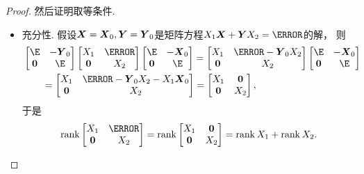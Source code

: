 \begin{example}
\begin{proof}
然后证明取等条件.
\begin{itemize}
	\item 充分性.
	假设\(\boldsymbol{X} = \boldsymbol{X}_0, \boldsymbol{Y} = \boldsymbol{Y}_0\)是矩阵方程\(\A\vb{X}+\vb{Y}\B=\C\)的解，
	则\begin{align*}
		&\begin{bmatrix}
			\E & -\vb{Y}_0 \\
			\vb0 & \E
		\end{bmatrix}
		\begin{bmatrix}
			\A & \C \\
			\vb0 & \B
		\end{bmatrix}
		\begin{bmatrix}
			\E & -\vb{X}_0 \\
			\vb0 & \E
		\end{bmatrix}
		= \begin{bmatrix}
			\A & \C-\vb{Y}_0\B \\
			\vb0 & \B
		\end{bmatrix}
		\begin{bmatrix}
			\E & -\vb{X}_0 \\
			\vb0 & \E
		\end{bmatrix} \\
		&\hspace{20pt}= \begin{bmatrix}
			\A & \C-\vb{Y}_0\B-\A\vb{X}_0 \\
			\vb0 & \B
		\end{bmatrix}
		= \begin{bmatrix}
			\A & \vb0 \\
			\vb0 & \B
		\end{bmatrix},
	\end{align*}
	于是\[
		\rank\begin{bmatrix}
			\A & \C \\
			\vb0 & \B
		\end{bmatrix}
		= \rank\begin{bmatrix}
			\A & \vb0 \\
			\vb0 & \B
		\end{bmatrix}
		= \rank \A + \rank \B.
	\]


\end{itemize}
\end{proof}
\end{example}

